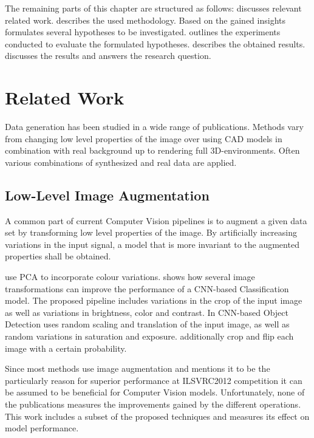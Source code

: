 The remaining parts of this chapter are structured as follows:  discusses relevant related work.  describes the used methodology. Based on the gained insights  formulates several hypotheses to be investigated.  outlines the experiments conducted to evaluate the formulated hypotheses.  describes the obtained results.  discusses the results and  answers the research question.

\section{Related Work}
\label{sec:training:related}

Data generation has been studied in a wide range of publications. Methods vary from changing low level properties of the image over using CAD models in combination with real background up to rendering full 3D-environments. Often various combinations of synthesized and real data are applied. 

\subsection{Low-Level Image Augmentation}

A common part of current Computer Vision pipelines is to augment a given data set by transforming low level properties of the image. By artificially increasing variations in the input signal, a model that is more invariant to the augmented properties shall be obtained.

\citeauthor{Krizhevsky2012a} \cite{Krizhevsky2012a} use \ac{PCA} to incorporate colour variations. \citeauthor{Howard2013} \cite{Howard2013} shows how several image transformations can improve the performance of a \ac{CNN}-based Classification model. The proposed pipeline includes variations in the crop of the input image as well as variations in brightness, color and contrast. In \ac{CNN}-based Object Detection \citeauthor{Redmon} \cite{Redmon} uses random scaling and translation of the input image, as well as random variations in saturation and exposure. \citeauthor{Liu} \cite{Liu} additionally crop and flip each image with a certain probability.

Since most methods use image augmentation and \citeauthor{Krizhevsky2012a} \cite{Krizhevsky2012a} mentions it to be the particularly reason for superior performance at ILSVRC2012 competition it can be assumed to be beneficial for Computer Vision models. Unfortunately, none of the publications measures the improvements gained by the different operations. This work includes a subset of the proposed techniques and measures its effect on model performance.


